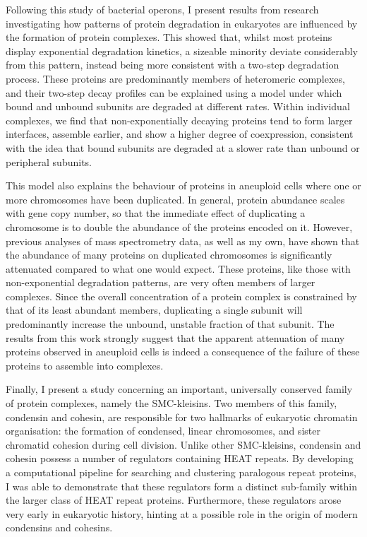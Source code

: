 \documentclass[a4paper,11pt,twoside,openright]{scrbook}
\begin{document}
Following this study of bacterial operons, I present results from research
investigating how patterns of protein degradation in eukaryotes are influenced
by the formation of protein complexes. This showed that, whilst most proteins
display exponential degradation kinetics, a sizeable minority deviate
considerably from this pattern, instead being more consistent with a two-step
degradation process. These proteins are predominantly members of heteromeric
complexes, and their two-step decay profiles can be explained using a model
under which bound and unbound subunits are degraded at different rates. Within
individual complexes, we find that non-exponentially decaying proteins tend to
form larger interfaces, assemble earlier, and show a higher degree of
coexpression, consistent with the idea that bound subunits are degraded at a
slower rate than unbound or peripheral subunits.

This model also explains the behaviour of proteins in aneuploid cells where one
or more chromosomes have been duplicated. In general, protein abundance scales
with gene copy number, so that the immediate effect of duplicating a chromosome
is to double the abundance of the proteins encoded on it. However, previous
analyses of mass spectrometry data, as well as my own, have shown that the
abundance of many proteins on duplicated chromosomes is significantly attenuated
compared to what one would expect. These proteins, like those with
non-exponential degradation patterns, are very often members of larger
complexes. Since the overall concentration of a protein complex is constrained
by that of its least abundant members, duplicating a single subunit will
predominantly increase the unbound, unstable fraction of that subunit. The
results from this work strongly suggest that the apparent attenuation of many
proteins observed in aneuploid cells is indeed a consequence of the failure of
these proteins to assemble into complexes.

Finally, I present a study concerning an important, universally conserved family
of protein complexes, namely the SMC-kleisins. Two members of this family,
condensin and cohesin, are responsible for two hallmarks of eukaryotic chromatin
organisation: the formation of condensed, linear chromosomes, and sister
chromatid cohesion during cell division. Unlike other SMC-kleisins, condensin
and cohesin possess a number of regulators containing HEAT repeats.  By
developing a computational pipeline for searching and clustering paralogous
repeat proteins, I was able to demonstrate that these regulators form a distinct
sub-family within the larger class of HEAT repeat proteins.  Furthermore, these
regulators arose very early in eukaryotic history, hinting at a possible role in
the origin of modern condensins and cohesins.
\end{document}
